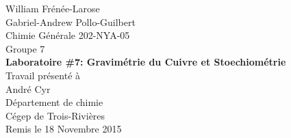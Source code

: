 \begin{titlepage}
\begin{center}
	William Frénée-Larose\\
	Gabriel-Andrew Pollo-Guilbert
	\\[36mm]
	Chimie Générale 202-NYA-05\\
	Groupe 7
	\\[36mm]
	\textbf{Laboratoire \#7: Gravimétrie du Cuivre et Stoechiométrie}
	\\[36mm]
	Travail présenté à\\
	André Cyr
	\\[36mm]
	Département de chimie\\
	Cégep de Trois-Rivières\\
	Remis le 18 Novembre 2015\\
\end{center}
\end{titlepage}
